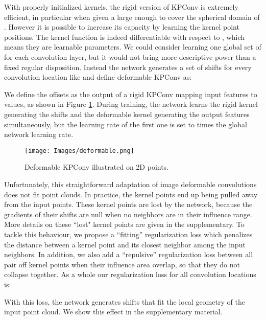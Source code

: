 \documentclass[10pt,twocolumn,letterpaper]{article}
\begin{document}
With properly initialized kernels, the rigid version of KPConv is extremely efficient, in particular when given a large enough  to cover the spherical domain of . However it is possible to increase its capacity by learning the kernel point positions. The kernel function  is indeed differentiable with respect to , which means they are learnable parameters. We could consider learning one global set of  for each convolution layer, but it would not bring more descriptive power than a fixed regular disposition. Instead the network generates a set of  shifts  for every convolution location  like \cite{dai2017deformable} and define deformable KPConv as:




We define the offsets  as the output of a rigid KPConv mapping   input features to  values, as shown in Figure \ref{fig_deform}. During training, the network learns the rigid kernel generating the shifts and the deformable kernel generating the output features simultaneously, but the learning rate of the first one is set to  times the global network learning rate.


\begin{figure}[t!]
    \centering
    \texttt{[image: Images/deformable.png]}
    \caption{Deformable KPConv illustrated on 2D points.}
    \label{fig_deform}
    \vspace{-2ex}
\end{figure}

Unfortunately, this straightforward adaptation of image deformable convolutions does not fit point clouds. In practice, the kernel points end up being pulled away from the input points. These kernel points are lost by the network, because the gradients of their shifts  are null when no neighbors are in their influence range. More details on these ``lost" kernel points are given in the supplementary. To tackle this behaviour, we propose a ``fitting'' regularization loss which penalizes the distance between a kernel point and its closest neighbor among the input neighbors. In addition, we also add a ``repulsive'' regularization loss between all pair off kernel points when their influence area overlap, so that they do not collapse together. As a whole our regularization loss for all convolution locations  is:







With this loss, the network generates shifts that fit the local geometry of the input point cloud. We show this effect in the supplementary material.
\end{document}
